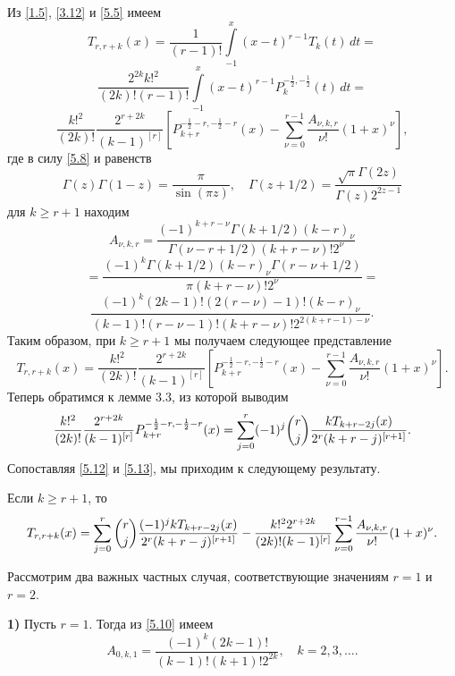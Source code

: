 Из \eqref{1.5}, \eqref{3.12} и  \eqref{5.5}    имеем
$$
T_{r,r+k}(x)=\frac{1}{(r-1)!}\int\limits^x_{-1}(x-t)^{r-1}T_k(t)\,dt=
$$
$$
\frac{2^{2k}k!^2}{(2k)!(r-1)!}\int\limits^x_{-1}(x-t)^{r-1}P_k^{-\frac12,-\frac12}(t)\,dt=
$$
\begin{equation}\label{5.10}
\frac{k!^2}{(2k)!}
\frac{2^{r+2k}}{(k-1)^{[r]}}\left[P_{k+r}^{-\frac12-r,-\frac12-r}(x)-\sum^{r-1}_{\nu=0}
\frac{A_{\nu,k,r}}{\nu!}(1+x)^{\nu}\right],
\end{equation}
где в силу \eqref{5.8} и равенств
$$
\Gamma(z)\Gamma(1-z)=\frac{\pi}{\sin(\pi z)},\quad \Gamma(z+1/2)=\frac{\sqrt{\pi}\Gamma(2z)}{\Gamma(z)2^{2z-1}}
$$
 для $k\ge r+1$ находим
$$
A_{\nu,k,r}=
\frac{(-1)^{k+r-\nu}\Gamma(k+1/2)(k-r)_{\nu}}{\Gamma(\nu-r+1/2)(k+r-\nu)!2^\nu}
$$
$$
=\frac{(-1)^{k}\Gamma(k+1/2)(k-r)_{\nu}\Gamma(r-\nu+1/2)}{\pi (k+r-\nu)!2^\nu}=
$$
\begin{equation}\label{5.11}
\frac{(-1)^{k}(2k-1)!(2(r-\nu)-1)!(k-r)_{\nu}}{(k-1)!(r-\nu-1)! (k+r-\nu)!2^{2(k+r-1)-\nu}}.
\end{equation}
Таким образом, при $k\ge r+1$ мы получаем следующее представление
\begin{equation}\label{5.12}
T_{r,r+k}(x)=\frac{k!^2}{(2k)!}
\frac{2^{r+2k}}{(k-1)^{[r]}}\left[P_{k+r}^{-\frac12-r,-\frac12-r}(x)-
\sum^{r-1}_{\nu=0}\frac{A_{\nu,k,r}}{\nu!}(1+x)^{\nu}\right].
\end{equation}
Теперь обратимся к лемме 3.3, из которой выводим
\begin{equation}\label{5.13}
\frac{k!^2}{(2k)!}
\frac{2^{r+2k}}{(k-1)^{[r]}}P_{k+r}^{-\frac12-r,-\frac12-r}(x)=
\sum_{j=0}^r(-1)^j{r\choose j}
{kT_{k+r-2j}(x)\over2^r(k+r-j)^{[r+1]}}.
\end{equation}
Сопоставляя \eqref{5.12} и  \eqref{5.13}, мы приходим к следующему результату.
\begin{theorem}
Если  $k\ge r+1$, то
\begin{equation}\label{5.14}
T_{r,r+k}(x)=\sum_{j=0}^r{r\choose j}
{(-1)^jkT_{k+r-2j}(x)\over2^r(k+r-j)^{[r+1]}}
-\frac{k!^22^{r+2k}}{(2k)!(k-1)^{[r]}}
\sum^{r-1}_{\nu=0}\frac{A_{\nu,k,r}}{\nu!}(1+x)^{\nu}.
\end{equation}
\end{theorem}

Рассмотрим два важных частных случая, соответствующие  значениям   $r=1$  и $r=2$.

\noindent\textbf{1)} Пусть $r=1$. Тогда из \eqref{5.10} имеем
\begin{equation}\label{5.15}
A_{0,k,1}=\frac{(-1)^{k}(2k-1)!}{(k-1)!(k+1)!2^{2k}}, \quad k=2,3,\ldots.
\end{equation}

